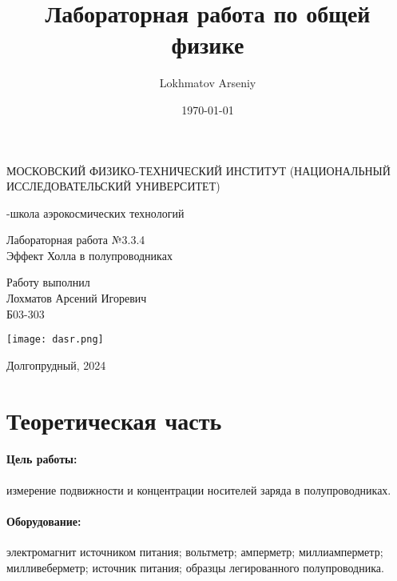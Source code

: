 \documentclass[a4paper,12pt]{article} %
\author{Lokhmatov Arseniy}
\title{Лабораторная работа по общей физике}
\date{\today}
\begin{document}
\begin{titlepage}
    \newpage
    \begin{center}
    {\large МОСКОВСКИЙ ФИЗИКО-ТЕХНИЧЕСКИЙ ИНСТИТУТ (НАЦИОНАЛЬНЫЙ ИССЛЕДОВАТЕЛЬСКИЙ УНИВЕРСИТЕТ)}
    \vspace{1cm}

    {-школа аэрокосмических технологий}
    \vspace{6em}
    \end{center}
    
    \vspace{1.2em}

    \begin{center}
    \Large Лабораторная работа №3.3.4 \\
    Эффект Холла в полупроводниках
    \linebreak
    \end{center}
    
    \vspace{11em}
    
    \begin{flushright}
                       {\large Работу выполнил\\
                       Лохматов Арсений Игоревич\\
                       Б03-303 }
    \end{flushright}

    \vspace{\fill}

    \begin{center}
        \texttt{[image: dasr.png]}
    \end{center}

    \begin{center}
    Долгопрудный, 2024
    \end{center}

    \end{titlepage}

\section{Теоретическая часть}

\paragraph{Цель работы:} измерение подвижности и концентрации носителей заряда в полупроводниках.


\paragraph{Оборудование:} электромагнит источником питания; вольтметр; амперметр; миллиамперметр; милливеберметр; источник питания; образцы легированного полупроводника.
\end{document}
